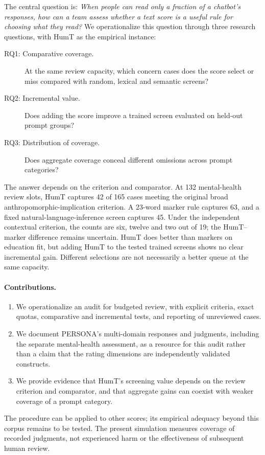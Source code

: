 The central question is: \emph{When people can read only a fraction of a chatbot's responses, how can a team assess whether a text score is a useful rule for choosing what they read?} We operationalize this question through three research questions, with HumT as the empirical instance:
\begin{description}
\item[RQ1: Comparative coverage.] At the same review capacity, which concern cases does the score select or miss compared with random, lexical and semantic screens?
\item[RQ2: Incremental value.] Does adding the score improve a trained screen evaluated on held-out prompt groups?
\item[RQ3: Distribution of coverage.] Does aggregate coverage conceal different omissions across prompt categories?
\end{description}

The answer depends on the criterion and comparator. At 132 mental-health review slots, HumT captures 42 of 165 cases meeting the original broad anthropomorphic-implication criterion. A 23-word marker rule captures 63, and a fixed natural-language-inference screen captures 45. Under the independent contextual criterion, the counts are six, twelve and two out of 19; the HumT--marker difference remains uncertain. HumT does better than markers on education fit, but adding HumT to the tested trained screens shows no clear incremental gain. Different selections are not necessarily a better queue at the same capacity.

\paragraph{Contributions.}
\begin{enumerate}
\item We operationalize an audit for budgeted review, with explicit criteria, exact quotas, comparative and incremental tests, and reporting of unreviewed cases.
\item We document PERSONA's multi-domain responses and judgments, including the separate mental-health assessment, as a resource for this audit rather than a claim that the rating dimensions are independently validated constructs.
\item We provide evidence that HumT's screening value depends on the review criterion and comparator, and that aggregate gains can coexist with weaker coverage of a prompt category.
\end{enumerate}
The procedure can be applied to other scores; its empirical adequacy beyond this corpus remains to be tested. The present simulation measures coverage of recorded judgments, not experienced harm or the effectiveness of subsequent human review.

